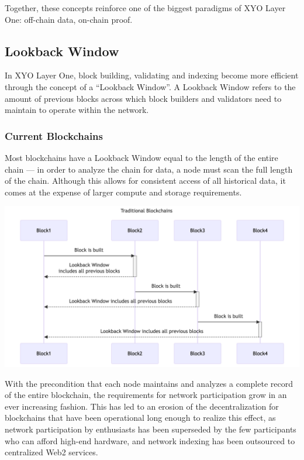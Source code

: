 \documentclass{article}
\begin{document}
Together, these concepts reinforce one of the biggest paradigms of XYO Layer One: off-chain data, on-chain proof.

\subsection{Lookback Window}
In XYO Layer One, block building, validating and indexing become more efficient through the concept of a “Lookback Window”. A Lookback Window refers to the amount of previous blocks across which block builders and validators need to maintain to operate within the network. 

\subsubsection{Current Blockchains}
Most blockchains have a Lookback Window equal to the length of the entire chain — in order to analyze the chain for data, a node must scan the full length of the chain. Although this allows for consistent access of all historical data, it comes at the expense of larger compute and storage requirements.

\begin{center}
    \includegraphics[width=15cm]{trad-blockchain-lookback-window.png}
\end{center}

With the precondition that each node maintains and analyzes a complete record of the entire blockchain, the requirements for network participation grow in an ever increasing fashion. This has led to an erosion of the decentralization for blockchains that have been operational long enough to realize this effect, as network participation by enthusiasts has been superseded by the few participants who can afford high-end hardware, and network indexing has been outsourced to centralized Web2 services.
\end{document}
